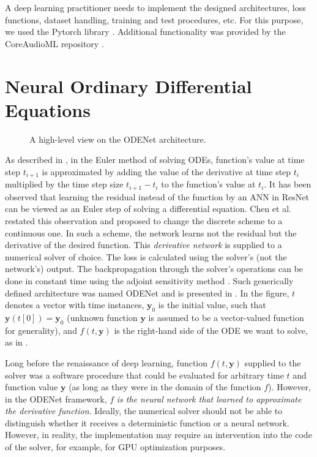 A deep learning practitioner needs to implement the designed architectures, loss functions, dataset handling, training and test procedures, etc. For this purpose, we used the Pytorch library \cite{Pytorch}. Additional functionality was provided by the CoreAudioML repository \cite{CoreAudioML}.

\section{Neural Ordinary Differential Equations}
\label{sec:neural_odes}

\begin{figure}
    \centering
    
    \caption{A high-level view on the ODENet architecture.}
    \label{fig:odenet_architecture}
\end{figure}

As described in , in the Euler method of solving \acp{ODE}, function's value at time step $t_{i+1}$ is approximated by adding the value of the derivative at time step $t_{i}$ multiplied by the time step size $t_{i+1} - t_i$ to the function's value at $t_i$.
It has been observed that learning the residual instead of the function by an \ac{ANN} in \ac{ResNet} can be viewed as an Euler step of solving a differential equation. Chen et al. \cite{Chen2018} restated this observation
and proposed to change the discrete scheme to a continuous one. In such a scheme, the network learns not the residual but the derivative of the desired function. This \emph{derivative network} is supplied to a numerical solver of choice. The loss is calculated using the solver's (not the network's) output. The backpropagation through the solver's operations can be done in constant time using the adjoint sensitivity method \cite{Chen2018}. Such generically defined architecture was named ODENet and is presented in . In the figure, $t$ denotes a vector with time instances, $\pmb{y}_0$ is the initial value, such that $\pmb{y}(t[0]) = \pmb{y}_0$ (unknown function $\pmb{y}$ is assumed to be a vector-valued function for generality), and $f(t, \pmb{y})$ is the right-hand side of the \ac{ODE} we want to solve, as in .

Long before the renaissance of deep learning, function $f(t, \pmb{y})$ supplied to the solver was a software procedure that could be evaluated for arbitrary time $t$ and function value $\pmb{y}$ (as long as they were in the domain of the function $f$). However, in the ODENet framework, $f$ \emph{is the neural network that learned to approximate the derivative function}. Ideally, the numerical solver should not be able to distinguish whether it receives a deterministic function or a neural network. However, in reality, the implementation may require an intervention into the code of the solver, for example, for \ac{GPU} optimization purposes.

